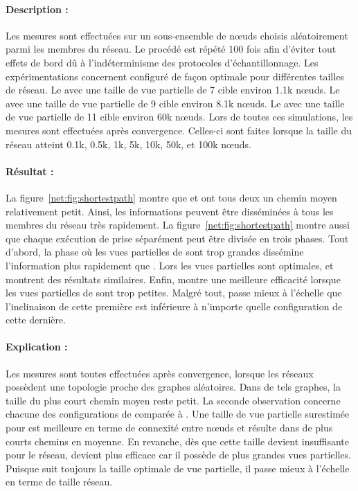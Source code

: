 \paragraph{Description :} Les mesures sont effectuées sur un sous-ensemble de
nœuds choisis aléatoirement parmi les membres du réseau. Le procédé est répété
100 fois afin d'éviter tout effets de bord dû à l'indéterminisme des protocoles
d'échantillonnage. Les expérimentations concernent \CYCLON configuré de façon
optimale pour différentes tailles de réseau. Le \CYCLON avec une taille de vue
partielle de 7 cible environ 1.1k nœuds. Le \CYCLON avec une taille de vue
partielle de 9 cible environ 8.1k nœuds. Le \CYCLON avec une taille de vue
partielle de 11 cible environ 60k nœuds. Lors de toutes ces simulations, les
mesures sont effectuées après convergence. Celles-ci sont faites lorsque la
taille du réseau atteint 0.1k, 0.5k, 1k, 5k, 10k, 50k, et 100k nœuds.

\paragraph{Résultat :} La figure~\ref{net:fig:shortestpath} montre que \CYCLON
et \SPRAY ont tous deux un chemin moyen relativement petit. Ainsi, les
informations peuvent être disséminées à tous les membres du réseau très
rapidement. La figure~\ref{net:fig:shortestpath} montre aussi que chaque
exécution de \CYCLON prise séparément peut être divisée en trois phases.  Tout
d'abord, la phase où les vues partielles de \CYCLON sont trop grandes dissémine
l'information plus rapidement que \SPRAY. Lors les vues partielles sont
optimales, \CYCLON et \SPRAY montrent des résultats similaires. Enfin, \SPRAY
montre une meilleure efficacité lorsque les vues partielles de \CYCLON sont trop
petites. Malgré tout, \SPRAY passe mieux à l'échelle que \CYCLON l'inclinaison
de cette première est inférieure à n'importe quelle configuration de cette
dernière.

\paragraph{Explication :} Les mesures sont toutes effectuées après convergence,
lorsque les réseaux possèdent une topologie proche des graphes aléatoires.  Dans
de tels graphes, la taille du plus court chemin moyen reste petit.  La seconde
observation concerne chacune des configurations de \CYCLON comparée à
\SPRAY. Une taille de vue partielle surestimée pour \CYCLON est meilleure en
terme de connexité entre nœuds et résulte dans de plus courts chemins en
moyenne. En revanche, dès que cette taille devient insuffisante pour le réseau,
\SPRAY devient plus efficace car il possède de plus grandes vues
partielles. Puisque \SPRAY suit toujours la taille optimale de vue partielle, il
passe mieux à l'échelle en terme de taille réseau.


